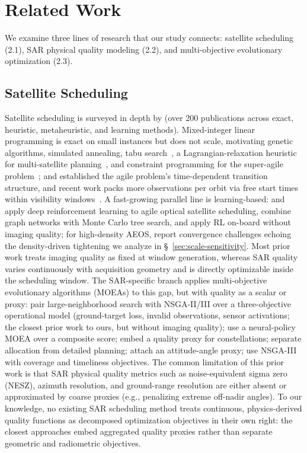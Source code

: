 \documentclass[preprint,12pt,authoryear]{elsarticle}
\begin{document}
\section{Related Work}
We examine three lines of research that our study connects:
satellite scheduling (2.1), SAR physical quality modeling (2.2),
and multi-objective evolutionary optimization (2.3).
\subsection{Satellite Scheduling}
Satellite scheduling is surveyed in depth by \citet{Ferrari2025} (over 200 publications
across exact, heuristic, metaheuristic, and learning methods). Mixed-integer linear
programming is exact on small instances but does not scale, motivating genetic
algorithms, simulated annealing, tabu search~\citep{Wang2019MILP,Chen2019MILPMulti},
a Lagrangian-relaxation heuristic for multi-satellite planning~\citep{Wang2026Lagrangian},
and constraint programming for the super-agile problem~\citep{Caleiras2026SuperAgile};
\citet{Lemaitre2002MultiSat} and \citet{Bianchessi2007} established the agile problem's
time-dependent transition structure, and recent work packs more observations per orbit
via free start times within visibility windows~\citep{Peng2019Orienteering,Chen2024LearnConstruct}.
A fast-growing parallel line is learning-based: \citet{Liu2024TwoStageDRL} and
\citet{Zhou2025TwoPhase} apply deep reinforcement learning to agile optical satellite
scheduling, \citet{Jacquet2024GNN} combine graph networks with Monte Carlo tree search, and
\citet{Herrmann2023} apply RL on-board without imaging quality; for
high-density AEOS, \citet{Wu2026WhaleHighDensity} report convergence challenges echoing
the density-driven tightening we analyze in \S~\ref{sec:scale-sensitivity}.
Most prior work treats imaging quality as fixed at window generation, whereas SAR quality
varies continuously with acquisition geometry and is directly optimizable inside the
scheduling window. The SAR-specific branch applies multi-objective evolutionary algorithms
(MOEAs) to this gap, but with quality as a scalar or proxy: \citet{Chang2022Gaofen} pair
large-neighborhood search with NSGA-II/III over a three-objective operational model
(ground-target loss, invalid observations, sensor activations; the closest prior work
to ours, but without imaging quality); \citet{Wei2025MONP} use a neural-policy MOEA over a
composite score; \citet{Kramer2025SARVis} embed a quality proxy for constellations;
\citet{Yao2024Bilevel} separate allocation from detailed planning;
\citet{ChangZhou2025Memetic} attach an attitude-angle proxy;
\citet{Wu2019NSGA3Formation} use NSGA-III with coverage and timeliness objectives.
The common limitation of this prior work is that SAR physical quality
metrics such as noise-equivalent sigma zero (NESZ), azimuth resolution, and
ground-range resolution are either absent or approximated by coarse
proxies (e.g., penalizing extreme off-nadir angles). To our knowledge,
no existing SAR scheduling method treats continuous, physics-derived
quality functions as decomposed optimization objectives in their own
right: the closest approaches embed aggregated quality
proxies rather than separate geometric and radiometric objectives.
\end{document}
